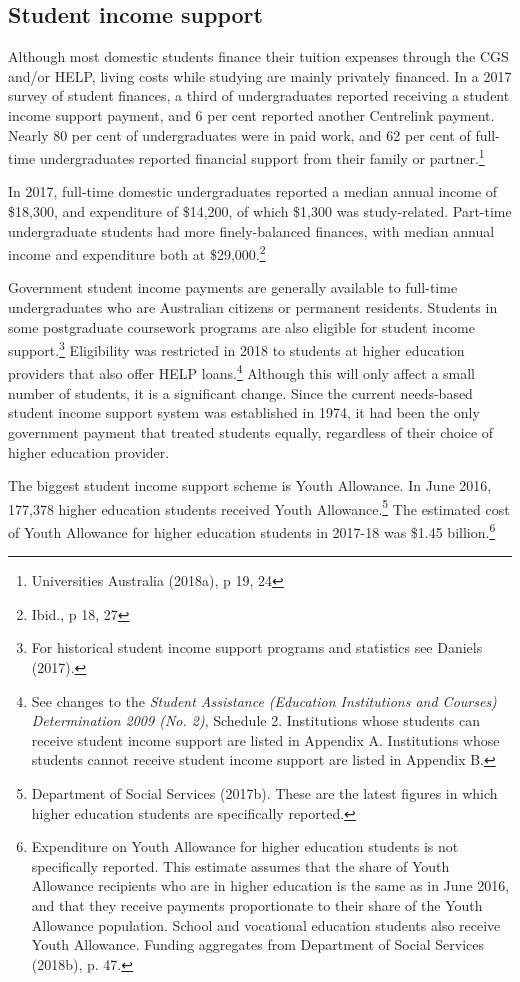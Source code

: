 \documentclass{grattan}
\begin{document}
%
\subsection{Student income support}\label{subsec:student-income-support}

Although most domestic students finance their tuition expenses through the CGS and/or HELP, living costs while studying are mainly privately financed. In a 2017 survey of student finances, a third of undergraduates reported receiving a student income support payment, and 6 per cent reported another Centrelink payment. Nearly 80 per cent of undergraduates were in paid work, and 62 per cent of full-time undergraduates reported financial support from their family or partner.\footnote{Universities Australia (2018a), p 19, 24}

In 2017, full-time domestic undergraduates reported a median annual income of \$18,300, and expenditure of \$14,200, of which \$1,300 was study-related. Part-time undergraduate students had more finely-balanced finances, with median annual income and expenditure both at \$29,000.\footnote{Ibid., p 18, 27}

Government student income payments are generally available to full-time undergraduates who are Australian citizens or permanent residents. Students in some postgraduate coursework programs are also eligible for student income support.\footnote{For historical student income support programs and statistics see Daniels (2017).} Eligibility was restricted in 2018 to students at higher education providers that also offer HELP loans.\footnote{See changes to the \emph{Student Assistance (Education Institutions and Courses) Determination 2009 (No. 2)}, Schedule 2. Institutions whose students can receive student income support are listed in Appendix A. Institutions whose students cannot receive student income support are listed in Appendix B.} Although this will only affect a small number of students, it is a significant change. Since the current needs-based student income support system was established in 1974, it had been the only government payment that treated students equally, regardless of their choice of higher education provider.

The biggest student income support scheme is Youth Allowance. In June 2016, 177,378 higher education students received Youth Allowance.\footnote{Department of Social Services (2017b). These are the latest figures in which higher education students are specifically reported.} The estimated cost of Youth Allowance for higher education students in 2017-18 was \$1.45 billion.\footnote{Expenditure on Youth Allowance for higher education students is not specifically reported. This estimate assumes that the share of Youth Allowance recipients who are in higher education is the same as in June 2016, and that they receive payments proportionate to their share of the Youth Allowance population. School and vocational education students also receive Youth Allowance. Funding aggregates from Department of Social Services (2018b), p. 47.}
\end{document}
